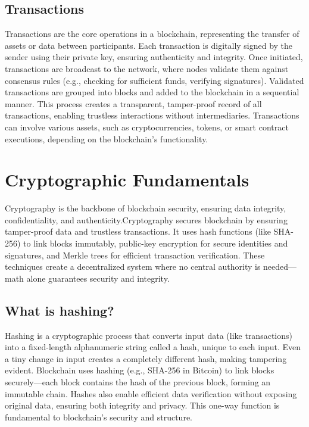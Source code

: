 \documentclass[12pt, a4paper]{article}
\begin{document}
\subsection{Transactions}
Transactions are the core operations in a blockchain, representing the transfer of assets or data between participants. Each transaction is digitally signed by the sender using their private key, ensuring authenticity and integrity. Once initiated, transactions are broadcast to the network, where nodes validate them against consensus rules (e.g., checking for sufficient funds, verifying signatures). Validated transactions are grouped into blocks and added to the blockchain in a sequential manner. This process creates a transparent, tamper-proof record of all transactions, enabling trustless interactions without intermediaries. Transactions can involve various assets, such as cryptocurrencies, tokens, or smart contract executions, depending on the blockchain's functionality.



\section{Cryptographic Fundamentals}
Cryptography is the backbone of blockchain security, ensuring data integrity, confidentiality, and authenticity.Cryptography secures blockchain by ensuring tamper-proof data and trustless transactions. It uses hash functions (like SHA-256) to link blocks immutably, public-key encryption for secure identities and signatures, and Merkle trees for efficient transaction verification. These techniques create a decentralized system where no central authority is needed—math alone guarantees security and integrity.
\subsection{What is hashing?}
Hashing is a cryptographic process that converts input data (like transactions) into a fixed-length alphanumeric string called a hash, unique to each input. Even a tiny change in input creates a completely different hash, making tampering evident. Blockchain uses hashing (e.g., SHA-256 in Bitcoin) to link blocks securely—each block contains the hash of the previous block, forming an immutable chain. Hashes also enable efficient data verification without exposing original data, ensuring both integrity and privacy. This one-way function is fundamental to blockchain’s security and structure.
\end{document}
